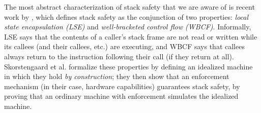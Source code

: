 \documentclass[acmsmall,review,anonymous]{acmart}\settopmatter{printfolios=true,printccs=false,printacmref=false}
\begin{document}
The most abstract characterization of stack safety that we are aware of is
recent work by \citet{Skorstengaard+19b,Skorstengaard+19}, which defines stack safety as the conjunction of two
properties:
{\em local state encapsulation (LSE)} and {\em well-bracketed control flow (WBCF)}.
Informally, LSE says that the contents of
a caller's stack frame are not read or written while its callees (and their callees, etc.) are
executing, and WBCF says that callees always
return to the instruction following their call (if they return at all).
Skorstengaard et al.{} formalize these properties by defining an idealized
machine in which they hold {\em by construction};
they then show that an enforcement
mechanism (in their case, hardware capabilities) guarantees stack safety, by
proving that an ordinary machine with enforcement simulates the idealized
machine.
\end{document}
